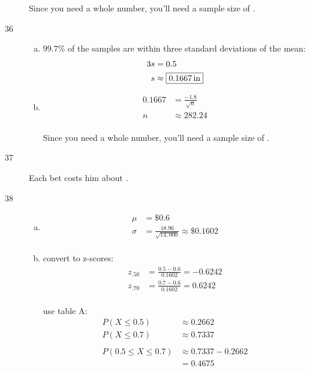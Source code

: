 \documentclass[letterpaper, landscape]{exam}
\newcommand{\cent}{\textcent\xspace}
\begin{document}
\begin{description}
        Since you need a whole number, you'll need a sample size of 
        .

      \item[36]
        \begin{enumerate}[(a)]
          \item 99.7\% of the samples are within three standard deviations of the
            mean:
            \begin{align*}
              3s & = 0.5 \\
              s  & \approx \boxed{ \unit[0.1667]{in} } \\
            \end{align*}

          \item 
            \begin{align*}
              0.1667 & = \frac{-1.8}{\sqrt{n}} \\
              n    & \approx 282.24 \\
            \end{align*}

            Since you need a whole number, you'll need a sample size of 
            .
        \end{enumerate}

      \item[37] Each bet costs him about \fbox{ 40\cent{} }.

      \newpage

      \item[38]
        \begin{enumerate}[(a)]
          \item 
            \begin{align*}
              \mu    & = \boxed{ \$0.6 } \\
              \sigma & = \frac{18.96}{\sqrt{14,000}} \approx \boxed{ \$0.1602 } \\
            \end{align*}
            
          \item
            convert to z-scores:
            \begin{align*}
              z_{.50} &= \frac{0.5 - 0.6}{0.1602} = -0.6242 \\
              z_{.70} &= \frac{0.7 - 0.6}{0.1602} = 0.6242 \\
            \end{align*}

            use table A:\@
            \begin{align*}
              P(X \leq 0.5) &\approx 0.2662 \\
              P(X \leq 0.7) &\approx 0.7337 \\
              \\
              P(0.5 \leq X \leq 0.7) & \approx 0.7337 - 0.2662 \\
                                     & = \boxed{ 0.4675 }
            \end{align*}


\end{enumerate}
\end{description}
\end{document}
